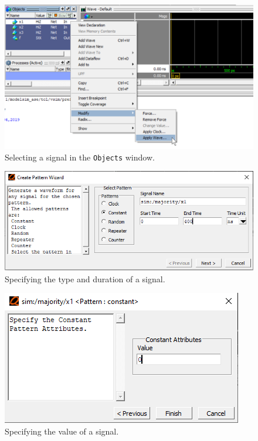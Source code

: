 \documentclass[11pt, twoside, pdftex]{article}
\begin{document}
\begin{figure}[H]
   \begin{center}
      \includegraphics[scale=1.0]{figures/figure10.png}
       \caption{Selecting a signal in the \texttt{Objects} window.} 
	 \label{fig:10}
	 \end{center}
\end{figure}

\begin{figure}[H]
   \begin{center}
      \includegraphics[scale=0.75]{figures/figure11.png}
   \caption{Specifying the type and duration of a signal.} 
	 \label{fig:11}
	 \end{center}
\end{figure}

\begin{figure}[H]
   \begin{center}
      \includegraphics[scale=0.75]{figures/figure12.png}
   \caption{Specifying the value of a signal.} 
	 \label{fig:12}
	 \end{center}
\end{figure}
\end{document}
